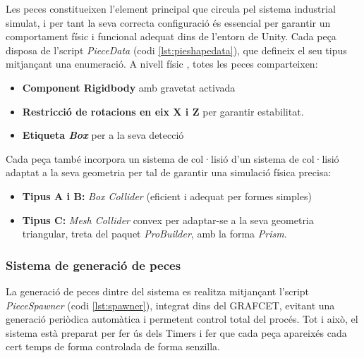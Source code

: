 \documentclass[a4paper,11pt,DIV=13,headings=normal,abstract=true,twoside=semi]{article}
\begin{document}
Les peces constitueixen l'element principal que circula pel sistema industrial simulat, i per tant la seva correcta configuració és essencial per garantir un comportament físic i funcional adequat dins de l'entorn de Unity. Cada peça disposa de l'script \textit{PieceData} (codi \ref{lst:pieshapedata}), que defineix el seu tipus mitjançant una enumeració. A nivell físic \cite{UnityRigidbody}, totes les peces comparteixen:

\begin{itemize}

\item \textbf{Component Rigidbody} amb gravetat activada

\item \textbf{Restricció de rotacions en eix X i Z} per garantir estabilitat. 

\item \textbf{Etiqueta \textit{Box}} per a la seva detecció \cite{UnityTags2023}


\end{itemize}

Cada peça també incorpora un sistema de col·lisió d'un sistema de col·lisió \cite{UnityColliders} adaptat a la seva geometria per tal de garantir una simulació física precisa:

\begin{itemize}

\item \textbf{Tipus A i B:} \textit{Box Collider} (eficient i adequat per formes simples)

\item \textbf{Tipus C:} \textit{Mesh Collider} convex per adaptar-se a la seva geometria triangular, treta del paquet \textit{ProBuilder}, amb la forma \textit{Prism}.

\end{itemize}

\subsubsection{Sistema de generació de peces}

La generació de peces dintre del sistema es realitza mitjançant l'script \textit{PieceSpawner} (codi \ref{lst:spawner}), integrat dins del GRAFCET, evitant una generació periòdica automàtica i permetent control total del procés. Tot i això, el sistema està preparat per fer ús dels Timers i fer que cada peça apareixés cada cert temps de forma controlada de forma senzilla. 
\end{document}
